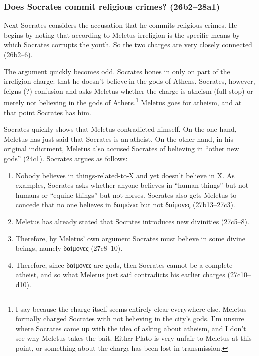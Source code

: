 \documentclass[11pt]{article}
\begin{document}
\subsubsection{Does Socrates commit religious crimes? (26b2--28a1)}

Next Socrates considers the accusation that he commits religious crimes.  He begins by noting that according to Meletus irreligion is the specific means by which Socrates corrupts the youth.  So the two charges are very closely connected (26b2--6).

The argument quickly becomes odd. Socrates hones in only on part of the irreligion charge: that he doesn't believe in the gods of Athens.  Socrates, however, feigns (?) confusion and asks Meletus whether the charge is atheism (full stop) or merely not believing in the gods of Athens.\footnote{I say  because the charge itself seems entirely clear everywhere else.  Meletus formally charged Socrates with not believing in the city's gods.  I'm unsure where Socrates came up with the idea of asking about atheism, and I don't see why Meletus takes the bait.  Either Plato is very unfair to Meletus at this point, or something about the charge has been lost in transmission.} Meletus goes for atheism, and at that point Socrates has him.

Socrates quickly shows that Meletus contradicted himself.  On the one hand, Meletus has just said that Socrates is an atheist.  On the other hand, in his original indictment, Meletus also accused Socrates of believing in ``other new gods'' (24c1).  Socrates argues as follows:

\begin{enumerate}

    \item Nobody believes in things-related-to-X and yet doesn't believe in X.  As examples, Socrates asks whether anyone believes in ``human things'' but not humans or ``equine things'' but not horses.  Socrates also gets Meletus to concede that no one believes in {\g δαιμόνια} but not {\g δαίμονες} (27b13--27c3).

    \item Meletus has already stated that Socrates introduces new divinities (27c5--8).

    \item Therefore, by Meletus' own argument Socrates must believe in some divine beings, namely {\g δαίμονες} (27c8--10).

    \item Therefore, since {\g δαίμονες} are gods, then Socrates cannot be a complete atheist, and so what Meletus just said contradicts his earlier charges (27c10--d10).

\end{enumerate}
\end{document}

